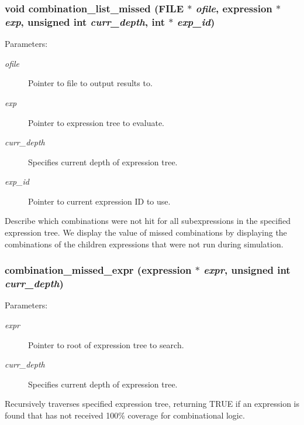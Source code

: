 \subsubsection{\setlength{\rightskip}{0pt plus 5cm}void combination\_\-list\_\-missed (FILE $\ast$ {\em ofile}, {\bf expression} $\ast$ {\em exp}, unsigned int {\em curr\_\-depth}, int $\ast$ {\em exp\_\-id})}\label{comb_8c_a15}


\begin{Desc}
\item[Parameters: ]\par
\begin{description}
\item[{\em 
ofile}]Pointer to file to output results to. \item[{\em 
exp}]Pointer to expression tree to evaluate. \item[{\em 
curr\_\-depth}]Specifies current depth of expression tree. \item[{\em 
exp\_\-id}]Pointer to current expression ID to use.\end{description}
\end{Desc}
Describe which combinations were not hit for all subexpressions in the specified expression tree. We display the value of missed combinations by displaying the combinations of the children expressions that were not run during simulation. 
\subsubsection{ combination\_\-missed\_\-expr ({\bf expression} $\ast$ {\em expr}, unsigned int {\em curr\_\-depth})}\label{comb_8c_a16}


\begin{Desc}
\item[Parameters: ]\par
\begin{description}
\item[{\em 
expr}]Pointer to root of expression tree to search. \item[{\em 
curr\_\-depth}]Specifies current depth of expression tree.\end{description}
\end{Desc}
Recursively traverses specified expression tree, returning TRUE if an expression is found that has not received 100\% coverage for combinational logic. 
